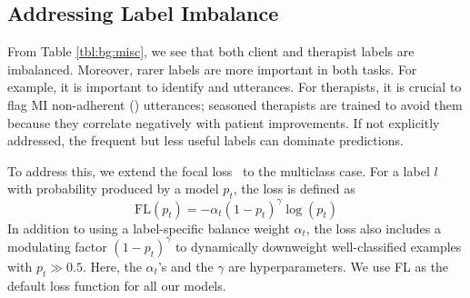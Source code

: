 \subsection{Addressing Label Imbalance}
\label{ssec:focal_loss}
From Table \ref{tbl:bg:misc}, we see that both client and therapist
labels are imbalanced. Moreover, rarer labels are more important in
both tasks. For example, it is important to identify \CHANGE and
\SUSTAIN utterances. For therapists, it is crucial to flag MI
non-adherent (\MIN) utterances; seasoned therapists are trained to
avoid them because they correlate negatively with patient
improvements. If not explicitly addressed, the frequent but less
useful labels can dominate predictions.


To address this, we extend the focal loss~\cite[FL][]{lin2017focal}
to the multiclass case. For a label $l$ with probability produced by
a model $p_t$, the loss is defined as
\begin{equation}
 \label{eq:focal}
\text{FL}(p_{t}) = -\alpha_{t} {(1 -p_{t})}^{\gamma} \log(p_{t})
\end{equation}
In addition to using a label-specific balance weight $\alpha_t$, the
loss also includes a modulating factor ${(1-p_{t})}^{\gamma}$ to
dynamically downweight well-classified examples with
$p_{t}\gg0.5$. Here, the $\alpha_t$'s and the $\gamma$ are
hyperparameters. We use FL as the default loss function for all our
models.

